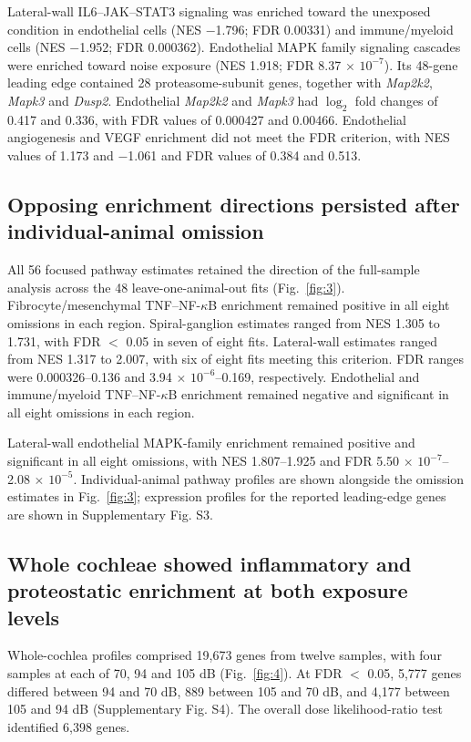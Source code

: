 Lateral-wall IL6--JAK--STAT3 signaling was enriched toward the unexposed condition in endothelial cells (NES \(-\)1.796; FDR 0.00331) and immune/\allowbreak{}myeloid cells (NES \(-\)1.952; FDR 0.000362). Endothelial MAPK family signaling cascades were enriched toward noise exposure (NES 1.918; FDR 8.37 \(\times\) \(10^{-7}\)). Its 48-gene leading edge contained 28 proteasome-subunit genes, together with \mbox{\textit{Map2k2}}, \mbox{\textit{Mapk3}} and \mbox{\textit{Dusp2}}. Endothelial \mbox{\textit{Map2k2}} and \mbox{\textit{Mapk3}} had \(\log_2\) fold changes of 0.417 and 0.336, with FDR values of 0.000427 and 0.00466. Endothelial angiogenesis and VEGF enrichment did not meet the FDR criterion, with NES values of 1.173 and \(-\)1.061 and FDR values of 0.384 and 0.513.

\subsection{Opposing enrichment directions persisted after individual-animal omission}

All 56 focused pathway estimates retained the direction of the full-sample analysis across the 48 leave-one-animal-out fits (Fig.~\ref{fig:3}). Fibrocyte/\allowbreak{}mesenchymal TNF--NF-\(\kappa\)B enrichment remained positive in all eight omissions in each region. Spiral-ganglion estimates ranged from NES 1.305 to 1.731, with FDR \(<\) 0.05 in seven of eight fits. Lateral-wall estimates ranged from NES 1.317 to 2.007, with six of eight fits meeting this criterion. FDR ranges were 0.000326--0.136 and 3.94 \(\times\) \(10^{-6}\)--0.169, respectively. Endothelial and immune/\allowbreak{}myeloid TNF--NF-\(\kappa\)B enrichment remained negative and significant in all eight omissions in each region.

Lateral-wall endothelial MAPK-family enrichment remained positive and significant in all eight omissions, with NES 1.807--1.925 and FDR 5.50 \(\times\) \(10^{-7}\)--2.08 \(\times\) \(10^{-5}\). Individual-animal pathway profiles are shown alongside the omission estimates in Fig.~\ref{fig:3}; expression profiles for the reported leading-edge genes are shown in Supplementary Fig. S3.

\subsection{Whole cochleae showed inflammatory and proteostatic enrichment at both exposure levels}

Whole-cochlea profiles comprised 19,673 genes from twelve samples, with four samples at each of 70, 94 and 105 dB (Fig.~\ref{fig:4}). At FDR \(<\) 0.05, 5,777 genes differed between 94 and 70 dB, 889 between 105 and 70 dB, and 4,177 between 105 and 94 dB (Supplementary Fig. S4). The overall dose likelihood-ratio test identified 6,398 genes.

